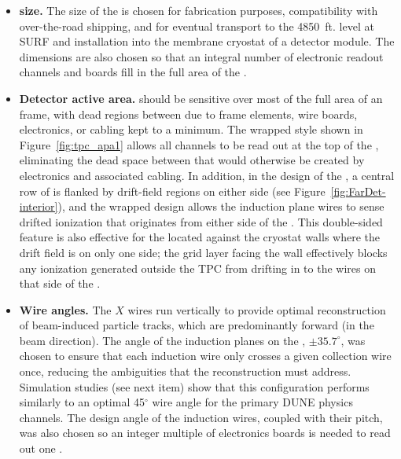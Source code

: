 \begin{itemize}
\item \textbf{ size.} The size of the  is chosen for fabrication purposes, compatibility with over-the-road shipping, and for eventual transport to the \SI{4850}{ft}. level at SURF and installation into the membrane cryostat of a detector module. The dimensions are also chosen so that an integral number of electronic readout channels and boards fill in the full area of the .


\item \textbf{Detector active area.}  should be sensitive over most of the full area of an  frame, with dead regions between  due to frame elements, wire boards, electronics, or cabling kept to a minimum.  The wrapped style shown in Figure~\ref{fig:tpc_apa1} allows all channels to be read out at the top of the , eliminating the dead space between  that would otherwise be created by electronics and associated cabling. In addition, in the design of the , a central row of  is flanked by drift-field regions on either side (see Figure~\ref{fig:FarDet-interior}), and the wrapped design allows the induction plane wires to sense drifted ionization that originates from either side of the .  This double-sided feature is also effective for the  located against the cryostat walls where the drift field is on only one side; the grid layer facing the wall effectively blocks any ionization generated outside the TPC from drifting in to the wires on that side of the .        

\item \textbf{Wire angles.} The $X$ wires run vertically to provide optimal reconstruction of beam-induced particle tracks, which are predominantly forward (in the beam direction). The angle of the induction planes on the , $\pm35.7^{\circ}$, was chosen to ensure that each induction wire only crosses a given collection wire once, reducing the ambiguities that the reconstruction must address.  Simulation studies (see next item) show that this configuration performs similarly to an optimal 45$^\circ$ wire angle for the primary DUNE physics channels.  The design angle of the induction wires, coupled with their pitch, was also chosen so an integer multiple of electronics boards is needed to read out one .



\end{itemize}
